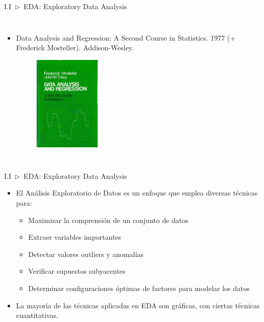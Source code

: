 \documentclass[xcolor=dvipsnames]{beamer}
\begin{document}
\begin{frame}{I.I~$\rhd$~EDA: Exploratory Data Analysis}
\begin{columns}
\begin{itemize}
\begin{figure}
                \end{figure}
                \item \scriptsize{Data Analysis and Regression: A Second Course in Statistics. 1977 (+ Frederick Mosteller). Addison-Wesley.}
                \begin{figure}
                \centering
                \includegraphics[width=0.3\textwidth]{imgs/intro/book1.jpg}
                \end{figure}
            \end{itemize}
    \end{columns}    
    \end{frame}

    \begin{frame}{I.I~$\rhd$~EDA: Exploratory Data Analysis}
        \begin{itemize}
            \item El Análisis Exploratorio de Datos es un enfoque que emplea diversas técnicas para:
            \vspace{2mm}
            \begin{itemize}
                \item Maximizar la comprensión de un conjunto de datos
                \item Extraer variables importantes
                \item Detectar valores outliers y anomalías
                \item Verificar supuestos subyacentes
                \item Determinar configuraciones óptimas de factores para modelar los datos
            \end{itemize}
            \vspace{2mm}
            \item La mayoría de las técnicas aplicadas en EDA son gráficas, con ciertas técnicas cuantitativas.
        \end{itemize}
    \end{frame}
\end{document}
